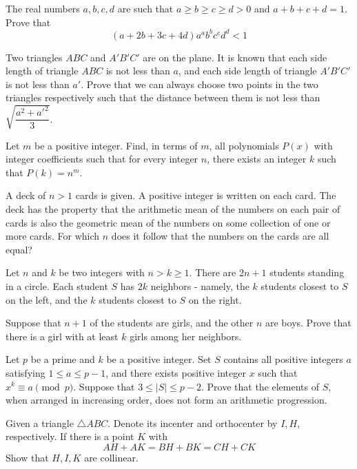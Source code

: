 \documentclass[11pt]{scrartcl}
\begin{document}
\begin{problem}[3813623497653179264]
	The real numbers $a, b, c, d$ are such that $a\geq b\geq c\geq d>0$ and $a+b+c+d=1$. Prove that
\[(a+2b+3c+4d)a^ab^bc^cd^d<1\]
\end{problem}
\begin{problem}[3838489129977355762]
Two triangles $ABC$ and $A'B'C'$ are on the plane. It is known that each side length of triangle $ABC$ is not less than $a$, and each side length of triangle $A'B'C'$ is not less than $a'$. Prove that we can always choose two points in the two triangles respectively such that the distance between them is not less than $\sqrt{\dfrac{a^2+a'^2}{3}}$.
\end{problem}
\begin{problem}[3838873685857064127]
Let \(m\) be a positive integer. Find, in terms of \(m\), all polynomials \(P(x)\) with integer coefficients such that for every integer \(n\), there exists an integer \(k\) such that \(P(k)=n^m\).
\end{problem}
\begin{problem}[3859961452154270883]
	A deck of $n > 1$ cards is given. A positive integer is written on each card. The deck has the property that the arithmetic mean of the numbers on each pair of cards is also the geometric mean of the numbers on some collection of one or more cards.
For which $n$ does it follow that the numbers on the cards are all equal?
\end{problem}
\begin{problem}[3866807698726339637]
Let $n$ and $k$ be two integers with $n>k\geqslant 1$. There are $2n+1$ students standing in a circle. Each student $S$ has $2k$ neighbors - namely, the $k$ students closest to $S$ on the left, and the $k$ students closest to $S$ on the right.

Suppose that $n+1$ of the students are girls, and the other $n$ are boys. Prove that there is a girl with at least $k$ girls among her neighbors.
\end{problem}
\begin{problem}[3869080664691172092]
Let $p$ be a prime and $k$ be a positive integer. Set $S$ contains all positive integers $a$ satisfying $1\le a \le p-1$, and there exists positive integer $x$ such that $x^k\equiv a \pmod p$.
Suppose that $3\le |S| \le p-2$. Prove that the elements of $S$, when arranged in increasing order, does not form an arithmetic progression.
\end{problem}
\begin{problem}[3906812380515301028]
Given a triangle $ \triangle ABC $. Denote its incenter and orthocenter by $ I, H $, respectively. If there is a point $ K $ with$$ AH+AK = BH+BK = CH+CK $$Show that $ H, I, K $ are collinear.
\end{problem}
\end{document}
